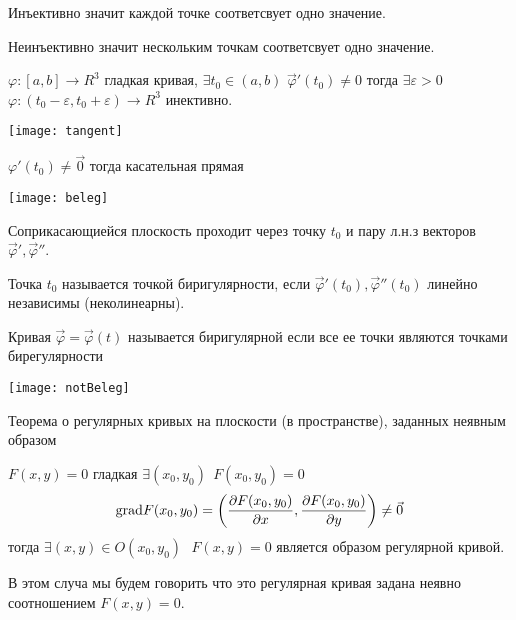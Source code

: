 \begin{define}
  Инъективно значит каждой точке соответсвует одно значение.

  Неинъективно значит нескольким точкам соответсвует одно значение.
\end{define}

\begin{theorem}
  $\varphi : [a,b] \to R^3$ гладкая кривая, $\exists t_0 \in (a,b)$
  $\vec \varphi' (t_0) \not = 0$ тогда $\exists \varepsilon > 0$
  $\varphi : (t_0 - \varepsilon, t_0 + \varepsilon) \to R^3$ инективно.
\end{theorem}

\begin{define}
  \texttt{[image: tangent]}

  $\varphi' (t_0) \not = \vec 0$ тогда касательная прямая
\end{define}

\begin{define}
  \texttt{[image: beleg]}

  Соприкасающиейся плоскость проходит через точку $t_0$ и пару л.н.з
  векторов $\vec \varphi', \vec \varphi''$.
\end{define}

\begin{define}
  Точка $t_0$ называется точкой биригулярности, если $\vec \varphi' (t_0),
  \vec \varphi''(t_0)$ линейно независимы (неколинеарны).
\end{define}

\begin{define}
  Кривая $\vec \varphi = \vec \varphi(t)$ называется биригулярной если все ее
  точки являются точками бирегулярности

  \texttt{[image: notBeleg]}
\end{define}

\begin{title}[\Large]
  Теорема о регулярных кривых на плоскости (в пространстве), заданных неявным
  образом
\end{title}

\begin{theorem}
  $F(x, y) = 0$ гладкая $\exists (x_0, y_0) ~~ F(x_0, y_0) = 0$
  $$
  \mathrm{grad} F(x_0, y_0) = \left( \frac{\partial F(x_0, y_0)}{\partial x},
  \frac{\partial F(x_0, y_0)}{\partial y} \right) \not= \vec 0
  $$
  тогда $\exists (x, y) \in O(x_0, y_0) ~~~ F(x, y) = 0$ является образом
  регулярной кривой.

  В этом случа мы будем говорить что это регулярная кривая задана неявно
  соотношением $F(x, y) = 0$.
\end{theorem}

